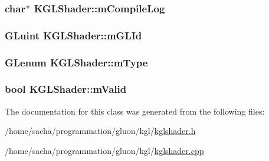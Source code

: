 \hypertarget{class_k_g_l_shader_f17a1dcd4b5b44e3a6acbfa5d2397c51}{
\subsubsection[{mCompileLog}]{\setlength{\rightskip}{0pt plus 5cm}char$\ast$ {\bf KGLShader::mCompileLog}}}
\label{class_k_g_l_shader_f17a1dcd4b5b44e3a6acbfa5d2397c51}


\hypertarget{class_k_g_l_shader_3d77624fd6e45291229504184035a02f}{
\subsubsection[{mGLId}]{\setlength{\rightskip}{0pt plus 5cm}GLuint {\bf KGLShader::mGLId}}}
\label{class_k_g_l_shader_3d77624fd6e45291229504184035a02f}


\hypertarget{class_k_g_l_shader_9a748dadd159cb1982f37bb8df05ca57}{
\subsubsection[{mType}]{\setlength{\rightskip}{0pt plus 5cm}GLenum {\bf KGLShader::mType}}}
\label{class_k_g_l_shader_9a748dadd159cb1982f37bb8df05ca57}


\hypertarget{class_k_g_l_shader_1b47e047354eeaab585f99217a509cff}{
\subsubsection[{mValid}]{\setlength{\rightskip}{0pt plus 5cm}bool {\bf KGLShader::mValid}}}
\label{class_k_g_l_shader_1b47e047354eeaab585f99217a509cff}




The documentation for this class was generated from the following files:\begin{CompactItemize}
\item 
/home/sacha/programmation/gluon/kgl/\hyperlink{kglshader_8h}{kglshader.h}\item 
/home/sacha/programmation/gluon/kgl/\hyperlink{kglshader_8cpp}{kglshader.cpp}\end{CompactItemize}

